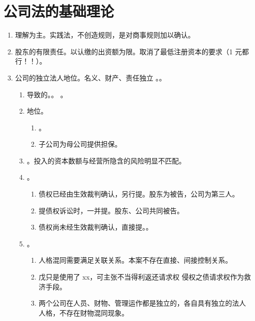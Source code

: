 \section{公司法的基础理论}
\begin{enumerate}
  \item 理解为主。实践法，不创造规则，是对商事规则加以确认。
  \item 股东的有限责任。以认缴的出资额为限。取消了最低注册资本的要求（1 元都行！！）。
  \item 公司的独立法人地位。名义、财产、责任独立 \yjt {}。。
        \begin{enumerate}
          \item {}导致的。。
                。
          \item {}地位。
                \begin{enumerate}
                  \item {}。
                  \item 子公司为母公司提供担保。
                \end{enumerate}
          \item {}。投入的资本数额与经营所隐含的风险明显不匹配。
          \item {}。
                \begin{enumerate}
                  \item 债权已经由生效裁判确认，另行提。股东为被告，公司为第三人。
                  \item 提债权诉讼时，一并提。股东、公司共同被告。
                  \item 债权尚未经生效裁判确认，直接提。。
                \end{enumerate}
          \item {}。
                \begin{enumerate}
                  \item 人格混同需要满足关联关系。本案不存在直接、间接控制关系。
                  \item 戊只是使用了 xx，可主张不当得利返还请求权 \hz 侵权之债请求权作为救济手段。
                  \item 两个公司在人员、财物、管理运作都是独立的，各自具有独立的法人人格，不存在财物混同现象。

\end{enumerate}
\end{enumerate}
\end{enumerate}
